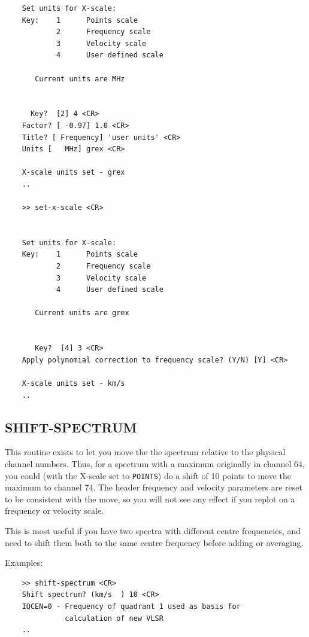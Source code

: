 \documentclass[11pt,twoside]{report}
\begin{document}
\begin{verbatim}
    Set units for X-scale:
    Key:    1      Points scale
            2      Frequency scale
            3      Velocity scale
            4      User defined scale

       Current units are MHz   


      Key?  [2] 4 <CR>
    Factor? [ -0.97] 1.0 <CR>
    Title? [ Frequency] 'user units' <CR>
    Units [   MHz] grex <CR>

    X-scale units set - grex  
    ..

    >> set-x-scale <CR>


    Set units for X-scale:
    Key:    1      Points scale
            2      Frequency scale
            3      Velocity scale
            4      User defined scale

       Current units are grex  


       Key?  [4] 3 <CR>
    Apply polynomial correction to frequency scale? (Y/N) [Y] <CR>

    X-scale units set - km/s  
    ..
\end{verbatim}

\subsection{SHIFT-SPECTRUM} 

This routine exists to let you move the the spectrum relative to the
physical channel numbers. Thus, for a spectrum with a maximum originally
in channel 64, you could (with the X-scale set to \verb+POINTS+) do a
shift of 10 points to move the maximum to channel 74. The header frequency
and velocity parameters are reset to be consistent with the move, so you 
will not see any effect if you replot on a frequency or velocity scale.

This is most useful if you have two spectra with different centre frequencies,
and need to shift them both to the same centre frequency before adding or
averaging.

Examples:
\begin{verbatim}
    >> shift-spectrum <CR>
    Shift spectrum? (km/s  ) 10 <CR>
    IQCEN=0 - Frequency of quadrant 1 used as basis for
              calculation of new VLSR
    ..
\end{verbatim}
\end{document}
